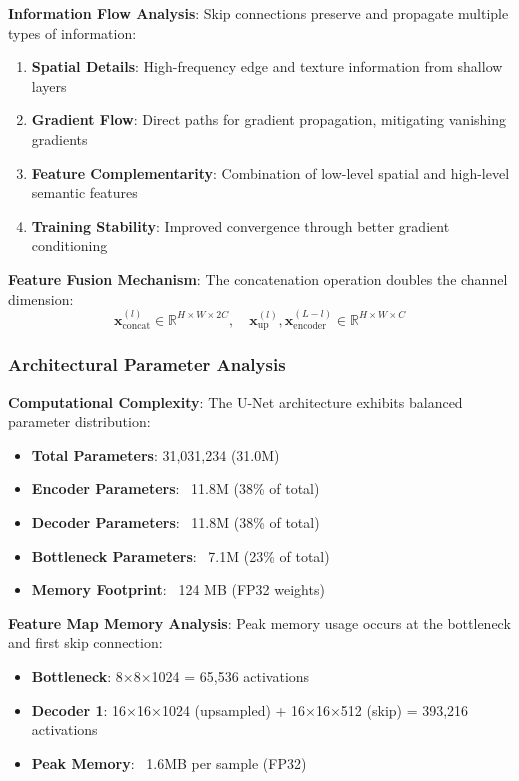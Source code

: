 \documentclass[12pt,a4paper]{article}
\begin{document}
\textbf{Information Flow Analysis}:
Skip connections preserve and propagate multiple types of information:
\begin{enumerate}
    \item \textbf{Spatial Details}: High-frequency edge and texture information from shallow layers
    \item \textbf{Gradient Flow}: Direct paths for gradient propagation, mitigating vanishing gradients
    \item \textbf{Feature Complementarity}: Combination of low-level spatial and high-level semantic features
    \item \textbf{Training Stability}: Improved convergence through better gradient conditioning
\end{enumerate}

\textbf{Feature Fusion Mechanism}:
The concatenation operation doubles the channel dimension:
\begin{equation}
\mathbf{x}^{(l)}_{\text{concat}} \in \mathbb{R}^{H \times W \times 2C}, \quad \mathbf{x}^{(l)}_{\text{up}}, \mathbf{x}^{(L-l)}_{\text{encoder}} \in \mathbb{R}^{H \times W \times C}
\end{equation}

\subsubsection{Architectural Parameter Analysis}

\textbf{Computational Complexity}:
The U-Net architecture exhibits balanced parameter distribution:
\begin{itemize}
    \item \textbf{Total Parameters}: 31,031,234 (31.0M)
    \item \textbf{Encoder Parameters}: ~11.8M (38\% of total)
    \item \textbf{Decoder Parameters}: ~11.8M (38\% of total)
    \item \textbf{Bottleneck Parameters}: ~7.1M (23\% of total)
    \item \textbf{Memory Footprint}: ~124 MB (FP32 weights)
\end{itemize}

\textbf{Feature Map Memory Analysis}:
Peak memory usage occurs at the bottleneck and first skip connection:
\begin{itemize}
    \item \textbf{Bottleneck}: 8×8×1024 = 65,536 activations
    \item \textbf{Decoder 1}: 16×16×1024 (upsampled) + 16×16×512 (skip) = 393,216 activations
    \item \textbf{Peak Memory}: ~1.6MB per sample (FP32)
\end{itemize}
\end{document}
